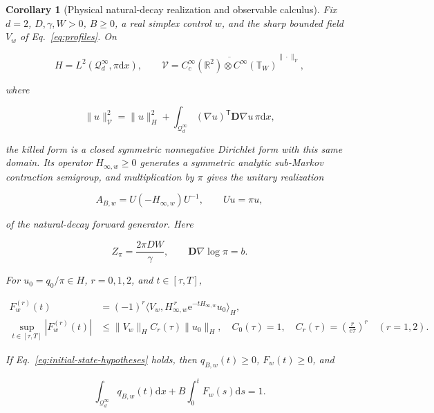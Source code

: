 \documentclass[aps,physrev,onecolumn,amsmath,amssymb,longbibliography]{revtex4-2}
\newcommand{\dd}{\mathrm d}
\newcommand{\e}{\mathrm e}
\newcommand{\Qinf}{\mathcal Q_d^{\infty}}
\newtheorem{corollary}[theorem]{Corollary}
\begin{document}
\begin{corollary}[Physical natural-decay realization and observable calculus]
\label{cor:physical-natural-decay}
Fix \(d=2\), \(D,\gamma,W>0\), \(B\ge0\), a real simplex control \(w\), and
the sharp bounded field \(V_w\) of Eq.~\eqref{eq:profiles}.  On

\begin{equation}
 H=L^2(\Qinf,\pi\dd x),\qquad
 \mathcal V=\overline{C_c^\infty(\mathbb R^2)\otimes
 C^\infty(\mathbb T_W)}^{\|\cdot\|_{\mathcal V}},
 \label{eq:physical-form-domain}
\end{equation}

where

\begin{equation}
 \|u\|_{\mathcal V}^2=\|u\|_H^2+
 \int_{\Qinf}(\nabla u)^{\mathsf T}\bm D\nabla u\,\pi\dd x,
 \label{eq:physical-form-norm}
\end{equation}

the killed form is a closed symmetric nonnegative Dirichlet form with this
same domain.  Its operator \(H_{\infty,w}\ge0\) generates a symmetric analytic
sub-Markov contraction semigroup, and multiplication by \(\pi\) gives the
unitary realization

\begin{equation}
 A_{B,w}=U(-H_{\infty,w})U^{-1},\qquad Uu=\pi u,
 \label{eq:physical-unitary-realization}
\end{equation}

of the natural-decay forward generator.  Here

\begin{equation}
 Z_\pi=\frac{2\pi DW}{\gamma},\qquad
 \bm D\nabla\log\pi=b.
 \label{eq:physical-reversible-identity}
\end{equation}

For \(u_0=q_0/\pi\in H\), \(r=0,1,2\), and \(t\in[\tau,T]\),

\begin{align}
 F_w^{(r)}(t)
 &=(-1)^r\langle V_w,H_{\infty,w}^{\,r}
          \e^{-tH_{\infty,w}}u_0\rangle_H,
 \label{eq:physical-observable-calculus}\\
 \sup_{t\in[\tau,T]}|F_w^{(r)}(t)|
 &\le \|V_w\|_H C_r(\tau)\|u_0\|_H,
 \quad C_0(\tau)=1,\quad
 C_r(\tau)=\left(\frac{r}{e\tau}\right)^r\quad(r=1,2).
 \label{eq:physical-spectral-bound}
\end{align}

If Eq.~\eqref{eq:initial-state-hypotheses} holds, then \(q_{B,w}(t)\ge0\),
\(F_w(t)\ge0\), and

\begin{equation}
 \int_{\Qinf}q_{B,w}(t)\dd x
 +B\int_0^tF_w(s)\dd s=1.
 \label{eq:physical-integrated-mass}
\end{equation}
\end{corollary}
\end{document}
